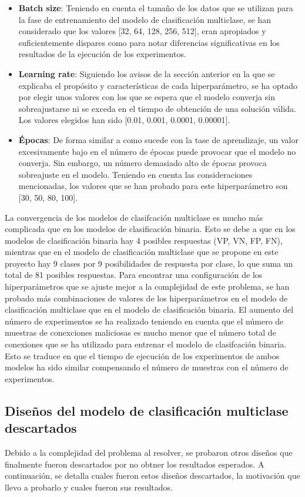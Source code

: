 \begin{itemize}
	\item \textbf{Batch size}: Teniendo en cuenta el tamaño de los datos que se utilizan para la fase de entrenamiento del modelo de clasificación multiclase, se han considerado que los valores [32, 64, 128, 256, 512], eran apropiados y suficientemente dispares como para notar diferencias significativas en los resultados de la ejecución de los experimentos.
	\item \textbf{Learning rate}: Siguiendo los avisos de la sección anterior en la que se explicaba el propósito y características de cada hiperparámetro, se ha optado por elegir unos valores con los que se espera que el modelo converja sin sobreajustarse ni se exceda en el tiempo de obtención de una solución válida. Los valores elegidos han sido [0.01, 0.001, 0.0001, 0.00001].
	\item \textbf{Épocas}: De forma similar a como sucede con la tase de aprendizaje, un valor excesivamente bajo en el número de épocas puede provocar que el modelo no converja. Sin embargo, un número demasiado alto de épocas provoca sobreajuste en el modelo. Teniendo en cuenta las consideraciones mencionadas, los valores que se han probado para este hiperparámetro son [30, 50, 80, 100].
\end{itemize}

La convergencia de los modelos de clasifcación multiclase es mucho más complicada que en los modelos de clasificación binaria. Esto se debe a que en los modelos de clasificación binaria hay 4 posibles respuestas (VP, VN, FP, FN), mientras que en el  modelo de clasificación multiclase que se propone en este proyecto hay 9 clases por 9 posibilidades de respuesta por clase, lo que suma un total de 81 posibles respuestas. Para encontrar una configuración de los hiperparámetros que se ajuste mejor a la complejidad de este problema, se han probado más combinaciones de valores de los hiperparámetros en el modelo de clasificación multiclase que en el modelo de clasificación binaria. El aumento del número de experimentos se ha realizado teniendo en cuenta que el número de muestras de conexciones maliciosas es mucho menor que el número total de conexiones que se ha utilizado para entrenar el modelo de clasifcación binaria. Esto se traduce en que el tiempo de ejecución de los experimentos de ambos modelos ha sido similar compensando el número de muestras con el número de experimentos.

\subsection{Diseños del modelo de clasificación multiclase descartados}
Debido a la complejidad del problema al resolver, se probaron otros diseños que finalmente fueron descartados por no obtner los resultados esperados. A continuación, se detalla cuales fueron estos diseños descartados, la motivación que llevo a probarlo y cuales fueron sus resultados.

